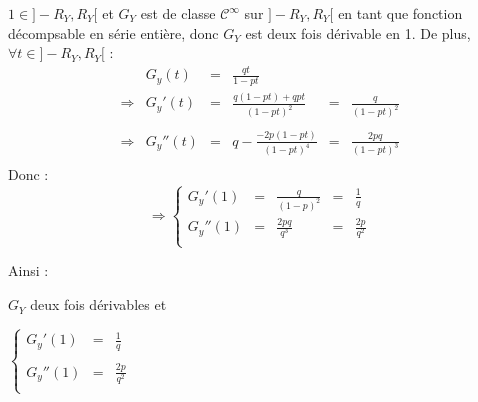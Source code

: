 $1\in]-R_Y, R_Y[$ et $G_Y$ est de classe $\mathcal{C}^{\infty}$ sur $]-R_Y, R_Y[$ en tant que fonction décompsable en série entière, donc $G_Y$ est deux fois dérivable en 1.
De plus, $\forall t\in]-R_Y, R_Y[$ :
\[
  \begin{array}{rrclcl}
                & G_y(t)   & = & \frac{qt}{1-pt}                                         \\
    \Rightarrow & G_y'(t)  & = & \frac{q(1-pt)+qpt}{(1-pt)^2} & = & \frac{q}{(1-pt)^2}   \\\\
    \Rightarrow & G_y''(t) & = & q-\frac{-2p(1-pt)}{(1-pt)^4} & = & \frac{2pq}{(1-pt)^3} \\
  \end{array}
\]
Donc :
\[
  \Rightarrow\left\{
  \begin{array}{rclcl}
    G_y'(1)  & = & \frac{q}{(1-p)^2} & = & \frac{1}{q}    \\
    G_y''(1) & = & \frac{2pq}{q^3}   & = & \frac{2p}{q^2} \\
  \end{array}
  \right.
\]

Ainsi :
\begin{result}
  $G_Y$ deux fois dérivables et

  $
    \left\{
    \begin{array}{rcl}
      G_y'(1)  & = & \frac{1}{q}    \\\\
      G_y''(1) & = & \frac{2p}{q^2} \\
    \end{array}
    \right.
  $
\end{result}
